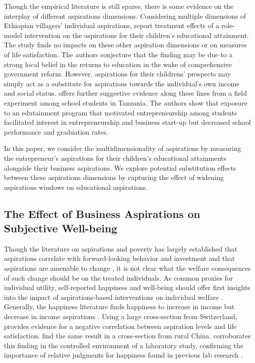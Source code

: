 \documentclass[11.5pt]{article}
\begin{document}
Though the empirical literature is still sparse, there is some evidence on the interplay of different aspirations dimensions. Considering multiple dimensions of Ethiopian villagers' individual aspirations, \citet{Bernard2014} report treatment effects of a role-model intervention on the aspirations for their children's educational attainment. The study finds no impacts on these other aspiration dimensions or on measures of life satisfaction. The authors conjecture that the finding may be due to a strong local belief in the returns to education in the wake of comprehensive government reform. However, aspirations for their childrens' prospects may simply act as a substitute for aspirations towards the individual's own income and social status. \citet{Bjorvatn2015} offers further suggestive evidence along these lines from a field experiment among school students in Tanzania. The authors show that exposure to an edutainment program that motivated entrepreneurship among students facilitated interest in entrepreneurship and business start-up but decreased school performance and graduation rates.

In this paper, we consider the multidimensionality of aspirations by measuring the entrepreneur's aspirations for their children's educational attainments alongside their business aspirations. We explore potential substitution effects between these aspirations dimensions by capturing the effect of widening aspirations windows on educational aspirations.

\subsection{The Effect of Business Aspirations on Subjective Well-being}

Though the literature on aspirations and poverty has largely established that aspirations correlate with forward-looking behavior and investment \citep[see, e.g.,][]{Janzen2017, Dalton2018, Kosec2017, Favara2017, Ross2017, Serneels2014} and that aspirations are amenable to change \citep[e.g.,][]{Bernard2014, Macours2014, Beaman2012, McBride2010}, it is not clear what the welfare consequences of such change should be on the treated individuals. As common proxies for individual utility, self-reported happiness and well-being should offer first insights into the impact of aspirations-based interventions on individual welfare \citep[see, e.g.,][]{Clark1994, Oswald1997, Ng1997, Easterlin2001, Stutzer2004, Frey2000, Frey2002}. Generally, the happiness literature finds happiness to increase in income but decrease in income aspirations \citep[e.g.,][]{Easterlin1995, Easterlin2001, Easterlin2003, Stutzer2004, Knight2012, Clark2008, Frey2002}. Using a large cross-section from Switzerland, \citet[][]{Stutzer2004} provides evidence for a negative correlation between aspiration levels and life satisfaction. \citet{Knight2012} find the same result in a cross-section from rural China. \citet{McBride2010} corroborates this finding in the controlled environment of a laboratory study, confirming the importance of relative judgments for happiness found in previous lab research \citep[see, e.g.,][]{Tversky1991, Smith1989}.
\end{document}
